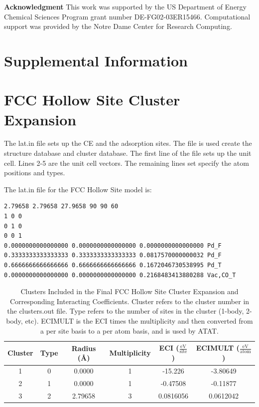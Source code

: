 \documentclass[11pt]{article}
\begin{document}
\textbf{Acknowledgment} This work was supported by the US Department of Energy Chemical Sciences Program grant number DE-FG02-03ER15466. Computational support was provided by the Notre Dame Center for Research Computing.

\clearpage
\printbibliography

\clearpage
\section*{Supplemental Information}
\makeatletter
\renewcommand{\thetable}{S\@arabic\c@table}
\renewcommand{\thefigure}{S\@arabic\c@figure}
\renewcommand{\thesection}{S\@arabic\c@section}
\renewcommand{\theequation}{S\@arabic\c@equation}
\makeatother

\setcounter{section}{0}
\setcounter{table}{0}
\setcounter{figure}{0}
\setcounter{equation}{0}

\section{FCC Hollow Site Cluster Expansion} \label{fccCE}
The lat.in file sets up the CE and the adsorption sites. The file is used create the structure database and cluster database. The first line of the file sets up the unit cell. Lines 2-5 are the unit cell vectors. The remaining lines set specify the atom positions and types.

The lat.in file for the FCC Hollow Site model is:
\begin{verbatim}
2.79658 2.79658 27.9658 90 90 60
1 0 0
0 1 0
0 0 1
0.0000000000000000 0.0000000000000000 0.0000000000000000 Pd_F
0.3333333333333333 0.3333333333333333 0.0817570000000032 Pd_F
0.6666666666666666 0.6666666666666666 0.1672046730538995 Pd_T
0.0000000000000000 0.0000000000000000 0.2168483413880288 Vac,CO_T
\end{verbatim}

\begin{table} [ht]
\caption{Clusters Included in the Final FCC Hollow Site Cluster Expansion and Corresponding Interacting Coefficients.  Cluster refers to the cluster number in the clusters.out file. Type refers to the number of sites in the cluster (1-body, 2-body, etc). ECIMULT is the ECI times the multiplicity and then converted from a per site basis to a per atom basis, and is used by ATAT.} %
\centering
\begin{tabular} {c c c c c c}
\toprule
Cluster & Type & Radius (\AA)& Multiplicity & ECI ($\frac{\mathrm{eV}}{\mathrm{site}}$) & ECIMULT ($\frac{\mathrm{eV}}{\mathrm{atom}}$) \\
\midrule
1 &	0 &	0.0000	& 1 &	-15.226	  &      -3.80649 \\
2 &	1 &	0.0000  & 1 &	-0.47508  &	-0.11877  \\
3 &	2 &	2.79658	& 3 &	0.0816056 &	0.0612042 \\
\bottomrule
\end{tabular}
\label{fcc_ce}
\end{table}
\end{document}
